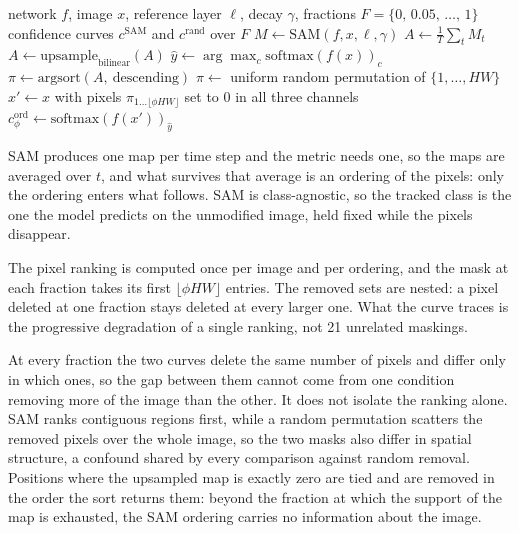 \begin{algorithm}[htbp]
\caption{Deletion metric for one image}
\label{alg:deletion}
\begin{algorithmic}[1]
\REQUIRE network $f$, image $x$, reference layer $\ell$, decay $\gamma$,
         fractions $F = \{0,\, 0.05,\, \dots,\, 1\}$
\ENSURE  confidence curves $c^{\mathrm{SAM}}$ and $c^{\mathrm{rand}}$ over $F$
\STATE $M \gets \mathrm{SAM}(f, x, \ell, \gamma)$ 
\STATE $A \gets \frac{1}{T}\sum_{t} M_{t}$
\STATE $A \gets \mathrm{upsample}_{\mathrm{bilinear}}(A)$ 
\STATE $\hat{y} \gets \arg\max_{c} \mathrm{softmax}\!\left(f(x)\right)_{c}$
    \STATE $\pi \gets \mathrm{argsort}(A,\ \text{descending})$
  \ELSE
    \STATE $\pi \gets$ uniform random permutation of $\{1, \dots, HW\}$
  \ENDIF
    \STATE $x' \gets x$ with pixels $\pi_{1 \dots \lfloor \phi HW \rfloor}$ set to $0$ in all three channels
    \STATE $c^{\mathrm{ord}}_{\phi} \gets \mathrm{softmax}\!\left(f(x')\right)_{\hat{y}}$
  \ENDFOR
\ENDFOR
\end{algorithmic}
\end{algorithm}
 
SAM produces one map per time
step and the metric needs one, so the maps are averaged over $t$, and what survives
that average is an ordering of the pixels: only the ordering enters what
follows. SAM is class-agnostic, so the tracked class is the one the model
predicts on the unmodified image, held fixed while the pixels disappear.
 
The pixel ranking is computed once per image and per ordering, and the mask at
each fraction takes its first $\lfloor \phi H W \rfloor$ entries. The removed
sets are nested: a pixel deleted at one fraction stays deleted at every larger
one. What the curve traces is the progressive degradation of a single ranking,
not 21 unrelated maskings.

At every fraction the two curves delete the same number of pixels and differ
only in which ones, so the gap between them cannot come from one condition
removing more of the image than the other. It does not isolate the ranking
alone. SAM ranks contiguous regions first, while a random permutation scatters
the removed pixels over the whole image, so the two masks also differ in spatial
structure, a confound shared by every comparison against random removal.
Positions where the upsampled map is exactly zero are tied and are removed in
the order the sort returns them: beyond the fraction at which the support of the
map is exhausted, the SAM ordering carries no information about the image.

